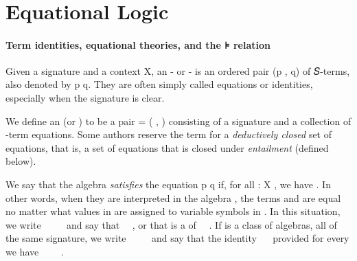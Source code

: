 \begin{code}
\AgdaSpace{}%
\AgdaSymbol{(}\AgdaSpace{}%
\AgdaSymbol{)}\AgdaSpace{}%
\<%
\\
%
\>[1]\AgdaSpace{}%
\AgdaSymbol{(}\AgdaSpace{}%
\AgdaSpace{}%
\AgdaSymbol{)}%
\>[25]\AgdaSymbol{=}\AgdaSpace{}%
\AgdaSpace{}%
%
\>[34]\AgdaSpace{}%
\AgdaSpace{}%
\AgdaSymbol{(}\AgdaSpace{}%
\AgdaSymbol{(}\AgdaSpace{}%
\AgdaSymbol{))}\AgdaSpace{}%
\AgdaSymbol{(}\AgdaSpace{}%
\AgdaSpace{}%
\AgdaOperator{\AgdaInductiveConstructor{,}}\AgdaSpace{}%
\AgdaSpace{}%
\AgdaSpace{}%
\AgdaSpace{}%
\AgdaSpace{}%
\AgdaSpace{}%
\AgdaSymbol{(}\AgdaSpace{}%
\AgdaSymbol{)}\AgdaSpace{}%
\AgdaSpace{}%
\AgdaSpace{}%
\AgdaSymbol{)}\<%
\end{code}

\section{Equational Logic}
\label{equational-logic}

\paragraph*{Term identities, equational theories, and the ⊧ relation}
Given a signature  and a context \ab X, an - or -
is an ordered pair (\ab p , \ab q) of 𝑆-terms, also denoted by \ab p  \ab q.
They are often simply called equations or identities, especially when the signature  is clear.

We define an  (or ) to be a pair  =
( , ) consisting of a signature  and a collection  of
-term equations. Some authors reserve the term  for
a \emph{deductively closed} set of equations, that is, a set of equations that is closed
under \emph{entailment} (defined below).

We say that the algebra  \emph{satisfies} the equation \ab p  \ab q if,
for all  : \ab X  ,
we have       .
In other words, when they are interpreted in the algebra ,
the terms  and  are equal no matter what values in  are assigned to variable symbols in .
In this situation, we write
~~~~ and say that   ~~,
or that  is a  of ~~.
If  is a class of algebras, all of the same signature, we write ~~~~
and say that   the identity ~~ provided for every   
we have ~~~~.

